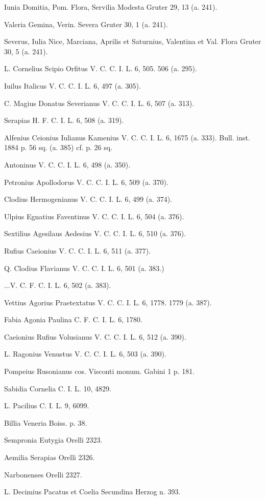 \documentclass[a4paper, 11pt, oneside, polutonikogreek, german]{article}
\begin{document}
Iunia Domitia, Pom. Flora, Servilia Modesta Gruter 29, 13 (a. 241).

Valeria Gemina, Verin. Severa Gruter 30, 1 (a. 241).

Severus, Iulia Nice, Marciana, Aprilis et Saturnius, Valentina et Val. Flora Gruter 30, 5 (a. 241).

L. Cornelius Scipio Orfitus V. C. C. I. L. 6, 505. 506 (a. 295).

Iuilus Italicus V. C. C. I. L. 6, 497 (a. 305).

C. Magius Donatus Severianus V. C. C. I. L. 6, 507 (a. 313).

Serapias H. F. C. I. L. 6, 508 (a. 319).

Alfenius Ceionius Iulianus Kamenius V. C. C. I. L. 6, 1675 (a. 333). Bull. inst. 1884 p. 56 sq. (a. 385) cf. p. 26 sq.

Antoninus V. C. C. I. L. 6, 498 (a. 350).

Petronius Apollodorus V. C. C. I. L. 6, 509 (a. 370).

Clodius Hermogenianus V. C. C. I. L. 6, 499 (a. 374).

Ulpius Egnatius Faventinus V. C. C. I. L. 6, 504 (a. 376).

Sextilius Agesilaus Aedesius V. C. C. I. L. 6, 510 (a. 376).

Rufius Caeionius V. C. C. I. L. 6, 511 (a. 377).

Q. Clodius Flavianus V. C. C. I. L. 6, 501 (a. 383.)

...V. C. F. C. I. L. 6, 502 (a. 383).

Vettius Agorius Praetextatus V. C. C. I. L. 6, 1778. 1779 (a. 387).

Fabia Agonia Paulina C. F. C. I. L. 6, 1780.

Caeionius Rufius Volusianus V. C. C. I. L. 6, 512 (a. 390).

L. Ragonius Venustus V. C. C. I. L. 6, 503 (a. 390).

Pompeius Rusonianus cos. Visconti monum. Gabini 1 p. 181.

Sabidia Cornelia C. I. L. 10, 4829.

L. Pacilius C. I. L. 9, 6099.

Billia Veneria Boiss. p. 38.

Sempronia Eutygia Orelli 2323.

Aemilia Serapias Orelli 2326.

Narbonenses Orelli 2327.

L. Decimius Pacatus et Coelia Secundina Herzog n. 393.
\end{document}
